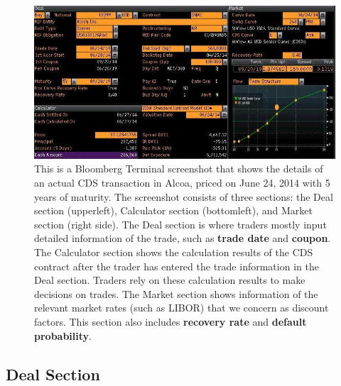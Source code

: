 \documentclass{jss}
\begin{document}
\begin{figure}[H]
\centering
\includegraphics[width=\textwidth]{images/AlcoaIncCDS.jpg}
\caption{\label{fig:bbScreenShot}This is a Bloomberg Terminal screenshot that shows the details of an actual CDS transaction in Alcoa, priced on June 24, 2014 with 5 years of maturity. The screenshot consists of three sections: the Deal section (upperleft), Calculator section (bottomleft), and Market section (right side). The Deal section is where traders mostly input detailed information of the trade, such as \textbf{trade date} and \textbf{coupon}. The Calculator section shows the calculation results of the CDS contract after the trader has entered the trade information in the Deal section. Traders rely on these calculation results to make decisions on trades. The Market section shows information of the relevant market rates (such as LIBOR) that we concern as discount factors. This section also includes \textbf{recovery rate} and \textbf{default probability}.}
\label{AlcoaIncCDS}
\end{figure}

\subsection{Deal Section}
\end{document}
